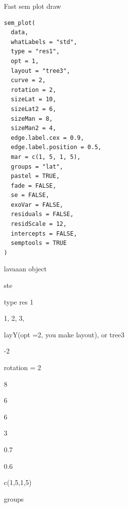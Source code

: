 \documentclass[a4paper]{book}
\begin{document}
%
\begin{Description}
Fast sem plot draw
\end{Description}
%
\begin{Usage}
\begin{verbatim}
sem_plot(
  data,
  whatLabels = "std",
  type = "res1",
  opt = 1,
  layout = "tree3",
  curve = 2,
  rotation = 2,
  sizeLat = 10,
  sizeLat2 = 6,
  sizeMan = 8,
  sizeMan2 = 4,
  edge.label.cex = 0.9,
  edge.label.position = 0.5,
  mar = c(1, 5, 1, 5),
  groups = "lat",
  pastel = TRUE,
  fade = FALSE,
  se = FALSE,
  exoVar = FALSE,
  residuals = FALSE,
  residScale = 12,
  intercepts = FALSE,
  semptools = TRUE
)
\end{verbatim}
\end{Usage}
%
\begin{Arguments}
\begin{ldescription}
\item[\code{data}] lavaaan object

\item[\code{whatLabels}] ste

\item[\code{type}] type res 1

\item[\code{opt}] 1, 2, 3,

\item[\code{layout}] layY(opt =2, you make layout), or tree3

\item[\code{curve}] -2

\item[\code{rotation}] rotation = 2

\item[\code{sizeLat}] 8

\item[\code{sizeLat2}] 6

\item[\code{sizeMan}] 6

\item[\code{sizeMan2}] 3

\item[\code{edge.label.cex}] 0.7

\item[\code{edge.label.position}] 0.6

\item[\code{mar}] c(1,5,1,5)

\item[\code{groups}] groups


\end{ldescription}
\end{Arguments}
\end{document}
